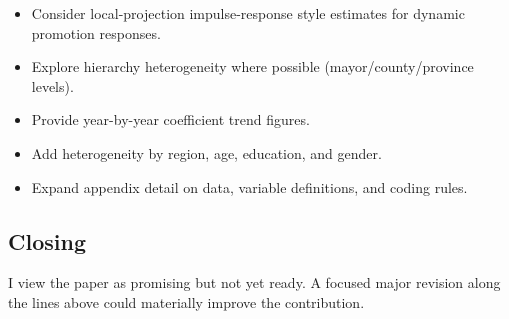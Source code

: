 \documentclass[12pt]{article}
\begin{document}
\begin{itemize}
    \item Consider local-projection impulse-response style estimates for dynamic promotion responses.
    \item Explore hierarchy heterogeneity where possible (mayor/county/province levels).
    \item Provide year-by-year coefficient trend figures.
    \item Add heterogeneity by region, age, education, and gender.
    \item Expand appendix detail on data, variable definitions, and coding rules.
\end{itemize}

\subsection*{Closing}

I view the paper as promising but not yet ready. A focused major revision along the lines above could materially improve the contribution.
\end{document}
